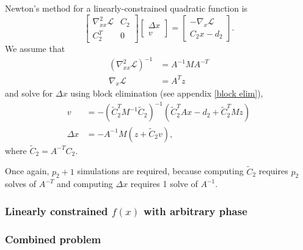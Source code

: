 \documentclass{article}
\newcommand{\tC}{\tilde{C}}
\begin{document}
Newton's method for a linearly-constrained quadratic function is
    \begin{equation}
    \begin{bmatrix} \nabla_{xx}^2 \mathcal{L} & C_2 \\ C_2^T & 0 \end{bmatrix} 
    \begin{bmatrix} \Delta x \\ v \end{bmatrix} = 
    \begin{bmatrix} -\nabla_x\mathcal{L} \\ C_2 x - d_2 \end{bmatrix}.
    \end{equation}
We assume that 
    \begin{subequations}\begin{align}
    (\nabla_{xx}^2 \mathcal{L})^{-1} &= A^{-1} M A^{-T} \\
    \nabla_x \mathcal{L} &= A^T z
    \end{align}\end{subequations}
    and solve for $\Delta x$ 
    using block elimination (see appendix \ref{block elim}),
    \begin{subequations}\begin{align}
    v &= -(\tC_2^T M^{-1} \tC_2)^{-1}(\tC_2^T Ax - d_2 + \tC_2^T Mz) \\
    \Delta x &= -A^{-1} M (z + \tC_2 v),
    \end{align}\end{subequations}
    where $\tC_2 = A^{-T} C_2$.

Once again, $p_2 + 1$ simulations are required, 
    because computing $\tC_2$ requires $p_2$ solves of $A^{-T}$ and
    computing $\Delta x$ requires 1 solve of $A^{-1}$.

    



\subsubsection{Linearly constrained $f(x)$ with arbitrary phase}
\subsubsection{Combined problem}
\end{document}
